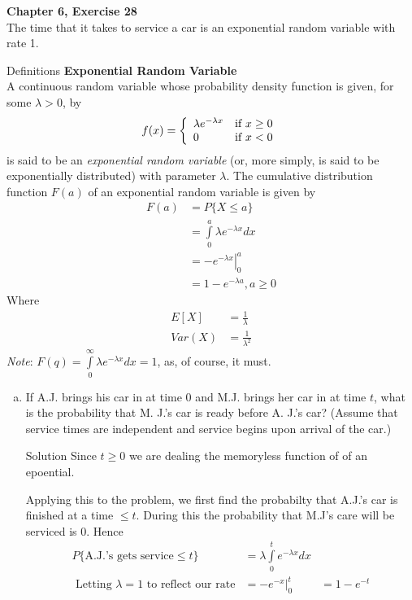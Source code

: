 \documentclass{article}
\begin{document}
\begin{spacing}{1.1}
\newpage
\begin{homeworkProblem}
  {\bf Chapter 6, Exercise 28}\\
  The time that it takes to service a car is an exponential 
  random variable with rate 1.
  \begin{homeworkSection}{Definitions}
    {\bf Exponential Random Variable}\\
    A continuous random variable whose probability density 
    function is given, for some $\lambda > 0$, by
      \[
        f(x) = \left\{
          \begin{array}{l l}
            \lambda e^{-\lambda x} &\text{if } x \ge 0\\
            0 &\text{if } x < 0
          \end{array} \right.
      \]
    is said to be an \emph{exponential random variable} (or, more simply, 
    is said to be exponentially distributed) with parameter $\lambda$. 
    The cumulative distribution function $F( a)$ of an exponential 
    random variable is given by
      \begin{align*}
        F(a) &= P\{ X \le a \}\\
        &= \int\limits_0^a \lambda e^{-\lambda x} dx\\
        &= \left.-e^{-\lambda x}\right|_0^a\\
        &= 1 - e^{-\lambda a},  a \ge 0
      \end{align*}
    Where
      \begin{align*}
        E[ X] &= \frac{ 1}{ \lambda}\\
        Var( X) &= \frac{ 1}{ \lambda^2}
      \end{align*}
    \emph{Note}: $F(q) = \int\limits_0^\infty \lambda e^{-\lambda x} dx = 1$, 
    as, of course, it must.
  \end{homeworkSection}
  \begin{enumerate}[(a)]
    \item If A.J. brings his car in at time 0 and M.J.
    brings her car in at time $t$, what is the probability 
    that M. J.'s car is ready before A. J.'s car? 
    (Assume that service times are independent and service 
    begins upon arrival of the car.)
      \begin{homeworkSection}{Solution}
        Since $t \ge 0$ we are dealing the memoryless function of
        of an epoential.
        
        Applying this to the problem, we first find the probabilty that
        A.J.'s car is finished at a time $\le t$.  During this the probability 
        that M.J's care will be serviced is $0$.  Hence
          \begin{align*}
            P\{ \text{A.J.'s gets service} \le t\} &= \lambda \int\limits_0^t e^{-\lambda x} dx\\
            \text{ Letting $\lambda = 1$ to reflect our rate}
            &= \left. -e^{-x} \right|_0^t
            &= 1 - e^{-t}
          \end{align*}


\end{homeworkSection}
\end{enumerate}
\end{homeworkProblem}
\end{spacing}
\end{document}
